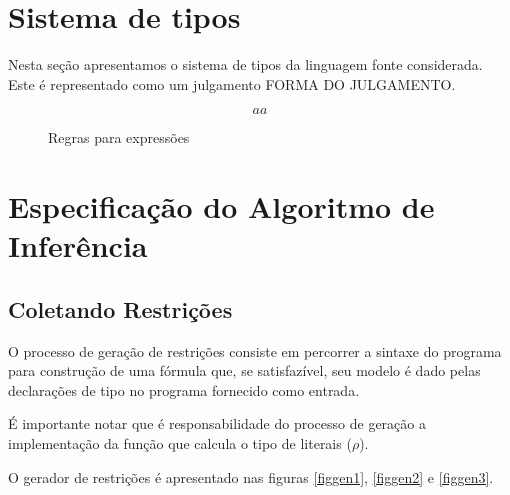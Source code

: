 \documentclass[a4paper,8pt]{article}
\begin{document}
    \section{Sistema de tipos}

    Nesta seção apresentamos o sistema de tipos da linguagem fonte
    considerada. Este é representado como um julgamento 
    FORMA DO JULGAMENTO.

    \begin{figure}
         \[
             aa
         \]
         \centering
         \caption{Regras para expressões}
         \label{exptyperules}
    \end{figure}


      
    \section{Especificação do Algoritmo de Inferência}

     \subsection{Coletando Restrições}\label{constrcollect}

     O processo de geração de restrições consiste em percorrer a
     sintaxe do programa para construção de uma fórmula que, se
     satisfazível, seu modelo é dado pelas declarações de tipo
     no programa fornecido como entrada. 

     É importante notar que é responsabilidade
     do processo de geração a implementação da função que calcula o
     tipo de literais ($\rho$).


     O gerador de restrições é apresentado nas figuras \ref{figgen1},
     \ref{figgen2} e \ref{figgen3}.
\end{document}

